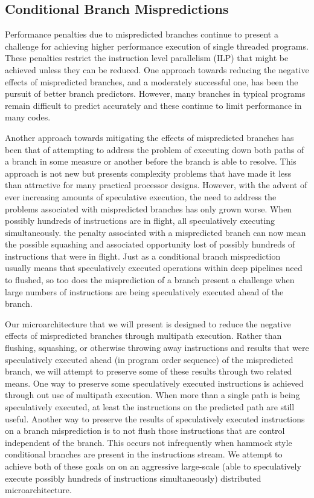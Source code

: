 \subsection{Conditional Branch Mispredictions}
%
Performance penalties due to mispredicted branches continue to
present a challenge for achieving higher performance execution
of single threaded programs.
These penalties restrict the instruction level parallelism (ILP)
that might be achieved unless they can be reduced.
One approach towards reducing the negative effects of mispredicted
branches, and a moderately successful one, has been the pursuit
of better branch predictors.  However, many branches in typical
programs remain difficult to predict accurately and these continue
to limit performance in many codes.

Another approach towards mitigating the effects of mispredicted branches
has been that of attempting to address the problem of executing
down both paths of a branch in some measure or another before the
branch is able to resolve.  This approach is not new but presents
complexity problems that have made it less than attractive for
many practical processor designs.  However, with the advent of ever
increasing amounts of speculative execution, the need to address
the problems associated with mispredicted branches has only grown worse.
When possibly hundreds of instructions are in flight, all speculatively
executing simultaneously.
the penalty associated with a mispredicted branch can now mean
the possible squashing and associated opportunity lost of possibly
hundreds of instructions that were in flight.  
Just as a conditional branch misprediction usually means that
speculatively executed operations within deep pipelines need
to flushed, so too does the misprediction of a branch present
a challenge when large numbers of instructions are being speculatively
executed ahead of the branch.

Our microarchitecture that we will present is designed to reduce
the
negative effects of mispredicted branches through multipath execution.
Rather than flushing, squashing, or otherwise throwing away
instructions and results that were speculatively executed ahead
(in program order sequence) of the mispredicted branch, we will
attempt to preserve some of these results through two related means.
One way to preserve some speculatively executed instructions is
achieved through out use of multipath execution.  When more than
a single path is being speculatively executed, at least the instructions
on the predicted path are still useful.  Another way
to preserve the results of speculatively executed instructions
on a branch misprediction is to not flush those instructions that
are control independent of the branch.  This occurs not infrequently
when hammock style conditional branches are present in the instructions
stream.
We attempt to achieve both of these goals on
on an aggressive large-scale (able to speculatively execute
possibly hundreds of instructions simultaneously)
distributed microarchitecture.  
%
